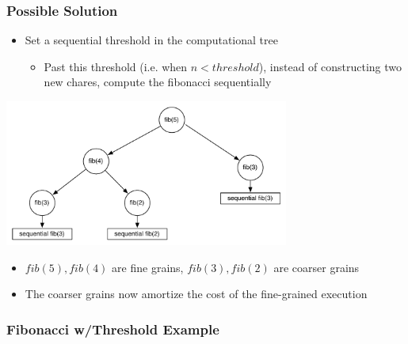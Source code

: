 \begin{frame}[fragile]
  \frametitle{Possible Solution}
  \begin{itemize}
  \item Set a sequential threshold in the computational tree
    \begin{itemize}
    \item Past this threshold (i.e. when $n < threshold$), instead of
      constructing two new chares, compute the fibonacci sequentially
    \end{itemize}
  \end{itemize}
  \begin{center} \includegraphics[width=0.7\textwidth]{figures/tree-threshold.pdf} \end{center}
  \begin{itemize}
    \item $fib(5), fib(4)$ are fine grains, $fib(3), fib(2)$ are coarser grains
    \item The coarser grains now amortize the cost of the fine-grained execution
  \end{itemize}
\end{frame}

\begin{frame}[fragile]
  \frametitle{Fibonacci w/Threshold Example}
  
\end{frame}
